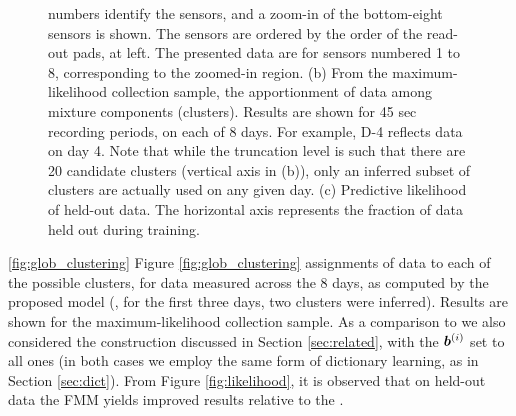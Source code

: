 \documentclass[journal]{IEEEtran}
\begin{document}
\begin{figure}[!htbp]
{{numbers identify the sensors, and a zoom-in of the bottom-eight
sensors is shown. The sensors are ordered by the order of the
read-out pads, at left. The presented data are for sensors numbered 1 to 8, corresponding to the zoomed-in region. (b) From the maximum-likelihood collection
sample, the apportionment of data among mixture components
(clusters). Results are shown for 45 sec recording periods, on each
of 8 days. For example, D-4 reflects data on day 4. Note that while the truncation level is such that there are 20 candidate clusters (vertical axis in (b)), only an inferred subset of clusters are actually used on any given day. (c) Predictive likelihood of held-out data. The
horizontal axis represents the fraction of data held out during training. 
}} \label{fig:long}
\end{figure}


\ref{fig:glob_clustering}  Figure \ref{fig:glob_clustering}  assignments of data to each of the possible clusters, for data measured across the 8 days, as computed by the proposed model (, for the first three days, two clusters were inferred). Results are shown for the maximum-likelihood collection sample. As a comparison to  
we also considered the  construction discussed in Section \ref{sec:related}, with the $\boldsymbol{b}^{(i)}$ set to all ones (in both cases we employ the same form of dictionary learning, as in Section \ref{sec:dict}). From Figure \ref{fig:likelihood}, it is observed that on held-out data the FMM yields improved results relative to the .
\end{document}
